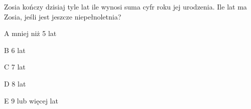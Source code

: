 \begin{tresc}
Zosia kończy dzisiaj tyle lat ile wynosi suma cyfr roku jej urodzenia. Ile lat ma Zosia, jeśli jest jeszcze niepełnoletnia?
\end{tresc}
\begin{wariant}{A} mniej niż 5 lat \end{wariant}
\begin{wariant}{B} 6 lat \end{wariant}
\begin{wariant}{C} 7 lat \end{wariant}
\begin{wariant}{D} 8 lat \end{wariant}
\begin{wariant}{E} 9 lub więcej lat \end{wariant}
